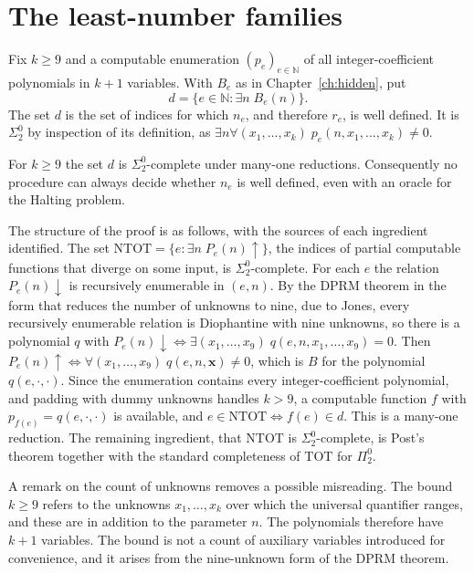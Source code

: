 \section{The least-number families}

Fix $k \ge 9$ and a computable enumeration $(p_e)_{e \in \mathbb{N}}$ of all integer-coefficient polynomials in $k+1$ variables. With $B_e$ as in Chapter~\ref{ch:hidden}, put
\[
d = \{ e \in \mathbb{N} : \exists n\; B_e(n) \}.
\]
The set $d$ is the set of indices for which $n_e$, and therefore $r_e$, is well defined. It is $\Sigma^0_2$ by inspection of its definition, as $\exists n \forall (x_1, \dots, x_k)\; p_e(n, x_1, \dots, x_k) \ne 0$.

\begin{theorem}
\label{thm:A3}
For $k \ge 9$ the set $d$ is $\Sigma^0_2$-complete under many-one reductions. Consequently no procedure can always decide whether $n_e$ is well defined, even with an oracle for the Halting problem.
\end{theorem}

The structure of the proof is as follows, with the sources of each ingredient identified. The set $\mathrm{NTOT} = \{ e : \exists n\; P_e(n) \uparrow \}$, the indices of partial computable functions that diverge on some input, is $\Sigma^0_2$-complete. For each $e$ the relation $P_e(n) \downarrow$ is recursively enumerable in $(e, n)$. By the DPRM theorem in the form that reduces the number of unknowns to nine, due to Jones, every recursively enumerable relation is Diophantine with nine unknowns, so there is a polynomial $q$ with $P_e(n) \downarrow \iff \exists (x_1, \dots, x_9)\; q(e, n, x_1, \dots, x_9) = 0$. Then $P_e(n) \uparrow \iff \forall (x_1, \dots, x_9)\; q(e, n, \mathbf{x}) \ne 0$, which is $B$ for the polynomial $q(e, \cdot, \cdot)$. Since the enumeration contains every integer-coefficient polynomial, and padding with dummy unknowns handles $k > 9$, a computable function $f$ with $p_{f(e)} = q(e, \cdot, \cdot)$ is available, and $e \in \mathrm{NTOT} \iff f(e) \in d$. This is a many-one reduction. The remaining ingredient, that $\mathrm{NTOT}$ is $\Sigma^0_2$-complete, is Post's theorem together with the standard completeness of $\mathrm{TOT}$ for $\Pi^0_2$.

A remark on the count of unknowns removes a possible misreading. The bound $k \ge 9$ refers to the unknowns $x_1, \dots, x_k$ over which the universal quantifier ranges, and these are in addition to the parameter $n$. The polynomials therefore have $k + 1$ variables. The bound is not a count of auxiliary variables introduced for convenience, and it arises from the nine-unknown form of the DPRM theorem.

